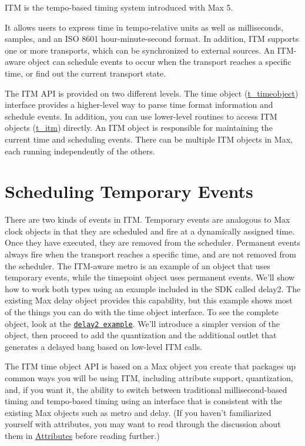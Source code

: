 ITM is the tempo-\/based timing system introduced with Max 5.

It allows users to express time in tempo-\/relative units as well as milliseconds, samples, and an ISO 8601 hour-\/minute-\/second format. In addition, ITM supports one or more transports, which can be synchronized to external sources. An ITM-\/aware object can schedule events to occur when the transport reaches a specific time, or find out the current transport state.

The ITM API is provided on two different levels. The time object (\hyperlink{group__time_gab568d2ffd4d84ca17c0b90cf2f7c6a40}{t\_\-timeobject}) interface provides a higher-\/level way to parse time format information and schedule events. In addition, you can use lower-\/level routines to access ITM objects (\hyperlink{group__time_gac656fa1f920c69cf77e6631bcec53077}{t\_\-itm}) directly. An ITM object is responsible for maintaining the current time and scheduling events. There can be multiple ITM objects in Max, each running independently of the others.\hypertarget{chapter_itm_chapter_itm_temp}{}\section{Scheduling Temporary Events}\label{chapter_itm_chapter_itm_temp}
There are two kinds of events in ITM. Temporary events are analogous to Max clock objects in that they are scheduled and fire at a dynamically assigned time. Once they have executed, they are removed from the scheduler. Permanent events always fire when the transport reaches a specific time, and are not removed from the scheduler. The ITM-\/aware metro is an example of an object that uses temporary events, while the timepoint object uses permanent events. We'll show how to work both types using an example included in the SDK called delay2. The existing Max delay object provides this capability, but this example shows most of the things you can do with the time object interface. To see the complete object, look at the \href{delay2_8c-source.html}{\tt delay2 example}. We'll introduce a simpler version of the object, then proceed to add the quantization and the additional outlet that generates a delayed bang based on low-\/level ITM calls.

The ITM time object API is based on a Max object you create that packages up common ways you will be using ITM, including attribute support, quantization, and, if you want it, the ability to switch between traditional millisecond-\/based timing and tempo-\/based timing using an interface that is consistent with the existing Max objects such as metro and delay. (If you haven't familiarized yourself with attributes, you may want to read through the discussion about them in \hyperlink{group__attr}{Attributes} before reading further.)

